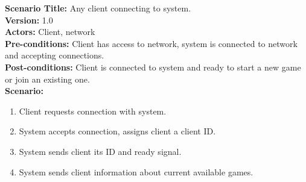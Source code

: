 \documentclass[letterpaper,12pt]{article}
\begin{document}
\noindent \textbf{Scenario Title:} Any client connecting to system.\\
\textbf{Version:} 1.0\\
\textbf{Actors:} Client, network\\
\textbf{Pre-conditions:} Client has access to network, system is connected to network and accepting connections.\\
\textbf{Post-conditions:} Client is connected to system and ready to start a new game or join an existing one.\\
\textbf{Scenario:}
\begin{enumerate}
   \item Client requests connection with system.
   \item System accepts connection, assigns client a client ID.
   \item System sends client its ID and ready signal.
   \item System sends client information about current available games.
\end{enumerate}
\end{document}
